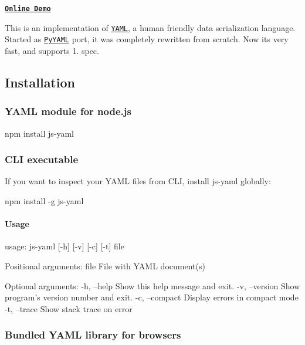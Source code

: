 \href{https://travis-ci.org/nodeca/js-yaml}{\tt } \href{https://www.npmjs.org/package/js-yaml}{\tt }

{\bfseries \href{http://nodeca.github.com/js-yaml/}{\tt Online Demo}}

This is an implementation of \href{http://yaml.org/}{\tt Y\+A\+ML}, a human friendly data serialization language. Started as \href{http://pyyaml.org/}{\tt Py\+Y\+A\+ML} port, it was completely rewritten from scratch. Now it\textquotesingle{}s very fast, and supports 1. spec.

\subsection*{Installation }

\subsubsection*{Y\+A\+ML module for node.\+js}


\begin{DoxyCode}
npm install js-yaml
\end{DoxyCode}


\subsubsection*{C\+LI executable}

If you want to inspect your Y\+A\+ML files from C\+LI, install js-\/yaml globally\+:


\begin{DoxyCode}
npm install -g js-yaml
\end{DoxyCode}


\paragraph*{Usage}


\begin{DoxyCode}
usage: js-yaml [-h] [-v] [-c] [-t] file

Positional arguments:
  file           File with YAML document(s)

Optional arguments:
  -h, --help     Show this help message and exit.
  -v, --version  Show program's version number and exit.
  -c, --compact  Display errors in compact mode
  -t, --trace    Show stack trace on error
\end{DoxyCode}


\subsubsection*{Bundled Y\+A\+ML library for browsers}


